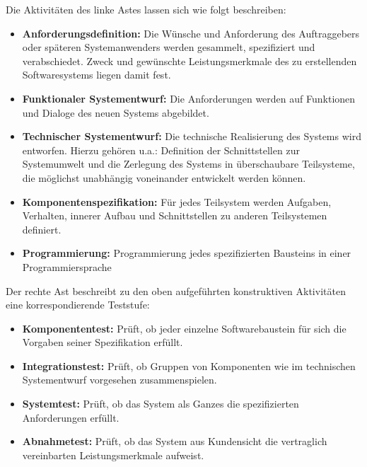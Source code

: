 Die Aktivitäten des linke Astes lassen sich wie folgt beschreiben: \cite{spillner_basiswissen_2007}

\begin{itemize}
      \item \textbf{Anforderungsdefinition:} Die Wünsche und Anforderung des Auftraggebers oder späteren Systemanwenders werden gesammelt, spezifiziert und verabschiedet. Zweck und gewünschte Leistungsmerkmale des zu erstellenden Softwaresystems liegen damit fest.
      \item \textbf{Funktionaler Systementwurf:} Die Anforderungen werden auf Funktionen und Dialoge des neuen Systems abgebildet.
      \item \textbf{Technischer Systementwurf:} Die technische Realisierung des Systems wird entworfen. Hierzu gehören u.a.: Definition der Schnittstellen zur Systemumwelt und die Zerlegung des Systems in überschaubare Teilsysteme, die möglichst unabhängig voneinander entwickelt werden können.
      \item \textbf{Komponentenspezifikation:} Für jedes Teilsystem werden Aufgaben, Verhalten, innerer Aufbau und Schnittstellen zu anderen Teilsystemen definiert.
      \item \textbf{Programmierung:} Programmierung jedes spezifizierten Bausteins in einer Programmiersprache 
\end{itemize}


Der rechte Ast beschreibt zu den oben aufgeführten konstruktiven Aktivitäten eine korrespondierende Teststufe: \cite{spillner_basiswissen_2007}

\begin{itemize}
      \item \textbf{Komponententest:} Prüft, ob jeder einzelne Softwarebaustein für sich die Vorgaben seiner Spezifikation erfüllt.
      \item \textbf{Integrationstest:} Prüft, ob Gruppen von Komponenten wie im technischen Systementwurf vorgesehen zusammenspielen.
      \item \textbf{Systemtest:} Prüft, ob das System als Ganzes die spezifizierten Anforderungen erfüllt.
      \item \textbf{Abnahmetest:} Prüft, ob das System aus Kundensicht die vertraglich vereinbarten Leistungsmerkmale aufweist.
\end{itemize}
